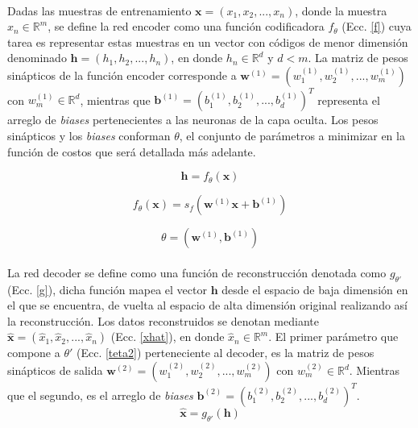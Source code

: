 \documentclass[12pt]{article}%
\begin{document}
\paragraph{}
Dadas las muestras de entrenamiento $\textbf{x}=(x_{1},x_{2},...,x_{n})$, donde la muestra $x_{n}\in \mathbb{R}^{m}$, se define la red encoder como una función codificadora $f_{\theta}$ (Ecc. \ref{f}) cuya tarea es representar estas muestras en un vector con códigos de menor dimensión denominado $\textbf{h}=(h_{1},h_{2},...,h_{n})$, en donde $h_{n} \in \mathbb{R}^{d}$ y $d<m$. La matriz de pesos sinápticos de la función encoder corresponde a $\textbf{w}^{(1)} = (w_{1}^{(1)},w_{2}^{(1)},...,w_{m}^{(1)})$ con $w_{m}^{(1)}\in \mathbb{R}^{d}$, mientras que $\textbf{b}^{(1)}=(b_{1}^{(1)},b_{2}^{(1)},...,b_{d}^{(1)})^T$ representa el arreglo de \textit{biases} pertenecientes a las neuronas de la capa oculta. Los pesos sinápticos y los \textit{biases} conforman $\theta$, el conjunto de parámetros a minimizar en la función de costos que será detallada más adelante.

\begin{equation}
\label{h}
\textbf{h}=f_{\theta}(\textbf{x})
\end{equation}

\begin{equation}
\label{f}
f_{\theta}(\textbf{x})=s_{f}(\textbf{w}^{(1)}\textbf{x}+\textbf{b}^{(1)})
\end{equation}

\begin{equation}
\label{teta1}
\theta=(\textbf{w}^{(1)},\textbf{b}^{(1)})
\end{equation}

\paragraph{}
La red decoder se define como una función de reconstrucción denotada como $g_{\theta'}$ (Ecc. \ref{g}), dicha función mapea el vector $\textbf{h}$ desde el espacio de baja dimensión en el que se encuentra, de vuelta al espacio de alta dimensión original realizando así la reconstrucción. Los datos reconstruidos se denotan mediante $\hat{\textbf{x}}=(\hat{x}_{1},\hat{x}_{2},...,\hat{x}_{n})$ (Ecc. \ref{xhat}), en donde $\hat{x}_{n}\in \mathbb{R}^{m}$. El primer parámetro que compone a $\theta'$ (Ecc. \ref{teta2}) perteneciente al decoder, es la matriz de pesos sinápticos de salida $\textbf{w}^{(2)} = (w_{1}^{(2)},w_{2}^{(2)},...,w_{m}^{(2)})$ con $w_{m}^{(2)}\in \mathbb{R}^{d}$. Mientras que el segundo, es el arreglo de \textit{biases} $\textbf{b}^{(2)}=(b_{1}^{(2)},b_{2}^{(2)},...,b_{d}^{(2)})^T$. 
\begin{equation}
\label{xhat}
\hat{\textbf{x}}=g_{\theta'}(\textbf{h})
\end{equation}
\end{document}
